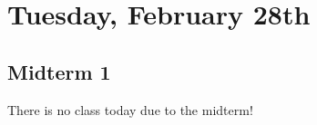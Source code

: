 \section{Tuesday, February 28th}
\subsection{Midterm 1}
There is no class today due to the midterm!
